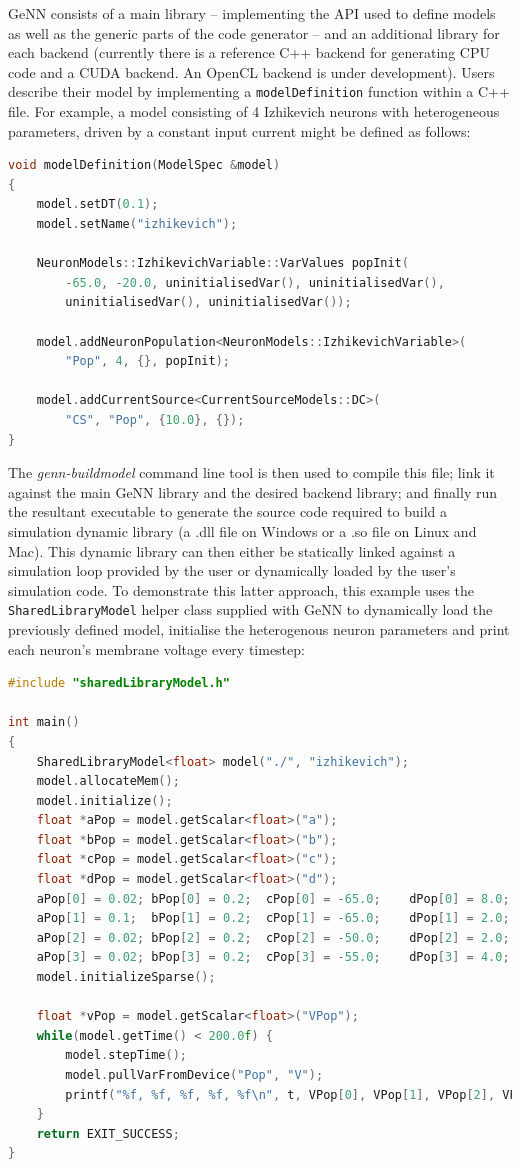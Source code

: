 \documentclass[utf8]{frontiersSCNS} %
\begin{document}
GeNN consists of a main library -- implementing the API used to define models as well as the generic parts of the code generator -- and an additional library for each backend (currently there is a reference C++ backend for generating CPU code and a CUDA backend. An OpenCL backend is under development).
Users describe their model by implementing a \lstinline{modelDefinition} function within a C++ file. For example, a model consisting of 4 Izhikevich neurons with heterogeneous parameters, driven by a constant input current might be defined as follows:
%
\begin{lstlisting}[language=C++]
void modelDefinition(ModelSpec &model)
{
    model.setDT(0.1);
    model.setName("izhikevich");
    
    NeuronModels::IzhikevichVariable::VarValues popInit(
        -65.0, -20.0, uninitialisedVar(), uninitialisedVar(),
        uninitialisedVar(), uninitialisedVar());
    
    model.addNeuronPopulation<NeuronModels::IzhikevichVariable>(
        "Pop", 4, {}, popInit);

    model.addCurrentSource<CurrentSourceModels::DC>(
        "CS", "Pop", {10.0}, {});
}
\end{lstlisting}
%
The \emph{genn-buildmodel} command line tool is then used to compile this file; link it against the main GeNN library and the desired backend library; and finally run the resultant executable to generate the source code required to build a simulation dynamic library (a .dll file on Windows or a .so file on Linux and Mac).
This dynamic library can then either be statically linked against a simulation loop provided by the user or dynamically loaded by the user's simulation code.
To demonstrate this latter approach, this example uses the \lstinline{SharedLibraryModel} helper class supplied with GeNN to dynamically load the previously defined model, initialise the heterogenous neuron parameters and print each neuron's membrane voltage every timestep: 
%
\begin{lstlisting}[language=C++]
#include "sharedLibraryModel.h"

int main()
{
    SharedLibraryModel<float> model("./", "izhikevich");
    model.allocateMem();
    model.initialize();
    float *aPop = model.getScalar<float>("a");
    float *bPop = model.getScalar<float>("b");
    float *cPop = model.getScalar<float>("c");
    float *dPop = model.getScalar<float>("d");
    aPop[0] = 0.02; bPop[0] = 0.2;  cPop[0] = -65.0;    dPop[0] = 8.0;  // RS
    aPop[1] = 0.1;  bPop[1] = 0.2;  cPop[1] = -65.0;    dPop[1] = 2.0;  // FS
    aPop[2] = 0.02; bPop[2] = 0.2;  cPop[2] = -50.0;    dPop[2] = 2.0;  // CH
    aPop[3] = 0.02; bPop[3] = 0.2;  cPop[3] = -55.0;    dPop[3] = 4.0;  // IB
    model.initializeSparse();

    float *vPop = model.getScalar<float>("VPop");
    while(model.getTime() < 200.0f) {
        model.stepTime();
        model.pullVarFromDevice("Pop", "V");
        printf("%f, %f, %f, %f, %f\n", t, VPop[0], VPop[1], VPop[2], VPop[3]);
    }
    return EXIT_SUCCESS;
}
\end{lstlisting}
\end{document}
